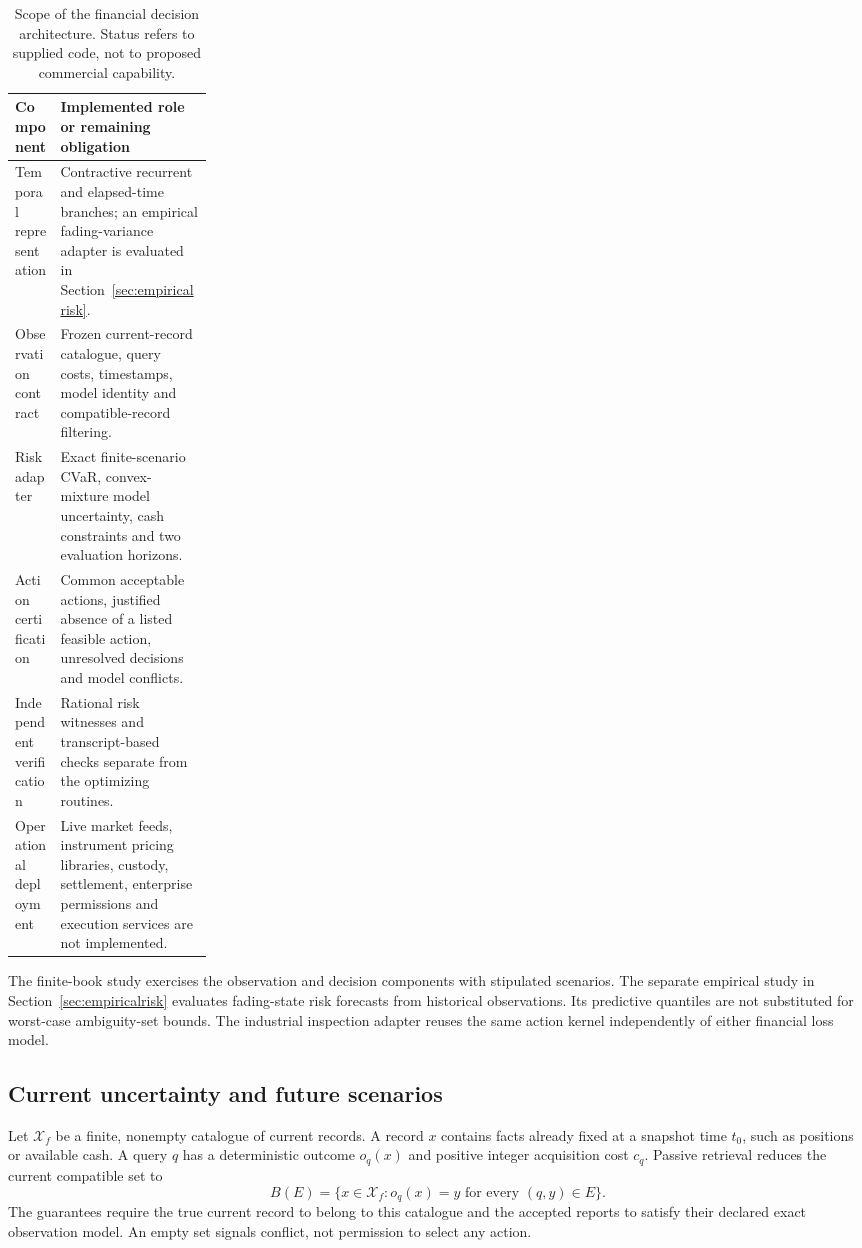 \documentclass[11pt,a4paper]{article}
\theoremstyle{definition}\newtheorem{definition}[theorem]{Definition}
\begin{document}
\begin{table}[!htbp]\centering\small
\caption{Scope of the financial decision architecture. Status refers to supplied code, not to proposed commercial capability.}\label{tab:riskarchitecture}
\begin{tabularx}{\linewidth}{p{0.23\linewidth}X}
\toprule Component & Implemented role or remaining obligation \\
\midrule Temporal representation & Contractive recurrent and elapsed-time branches; an empirical fading-variance adapter is evaluated in Section~\ref{sec:empiricalrisk}.\\
Observation contract & Frozen current-record catalogue, query costs, timestamps, model identity and compatible-record filtering.\\
Risk adapter & Exact finite-scenario CVaR, convex-mixture model uncertainty, cash constraints and two evaluation horizons.\\
Action certification & Common acceptable actions, justified absence of a listed feasible action, unresolved decisions and model conflicts.\\
Independent verification & Rational risk witnesses and transcript-based checks separate from the optimizing routines.\\
Operational deployment & Live market feeds, instrument pricing libraries, custody, settlement, enterprise permissions and execution services are not implemented.\\
\bottomrule
\end{tabularx}
\end{table}

The finite-book study exercises the observation and decision components with stipulated scenarios. The separate empirical study in Section~\ref{sec:empiricalrisk} evaluates fading-state risk forecasts from historical observations. Its predictive quantiles are not substituted for worst-case ambiguity-set bounds. The industrial inspection adapter reuses the same action kernel independently of either financial loss model.

\subsection{Current uncertainty and future scenarios}
Let $\mathcal X_f$ be a finite, nonempty catalogue of current records. A record $x$ contains facts already fixed at a snapshot time $t_0$, such as positions or available cash. A query $q$ has a deterministic outcome $o_q(x)$ and positive integer acquisition cost $c_q$. Passive retrieval reduces the current compatible set to
\begin{equation}
 B(E)=\{x\in\mathcal X_f:o_q(x)=y\text{ for every }(q,y)\in E\}.
 \label{eq:riskbelief}
\end{equation}
The guarantees require the true current record to belong to this catalogue and the accepted reports to satisfy their declared exact observation model. An empty set signals conflict, not permission to select any action.
\end{document}
